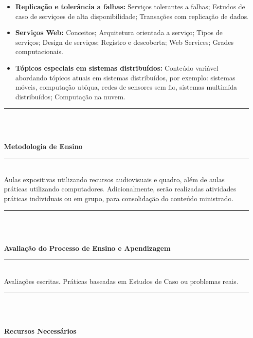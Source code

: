\begin{itemize}
\item \textbf{Replicação e tolerância a falhas:} Servi\c{c}os tolerantes a falhas; Estudos de caso de servi\c{c}oes de alta disponibilidade; Transa\c{c}\~oes com replica\c{c}\~ao de dados.

\item \textbf{Serviços Web:} Conceitos; Arquitetura orientada a servi\c{c}o; Tipos de servi\c{c}os; Design de servi\c{c}os; Registro e descoberta; Web Services; Grades computacionais.

\item \textbf{T\'opicos especiais em sistemas distribu\'idos:} Conte\'udo vari\'avel abordando t\'opicos atuais em sistemas distribu\'idos, por exemplo: sistemas m\'oveis, computa\c{c}\~ao ub\'iqua, redes de sensores sem fio, sistemas multim\'ida distribu\'idos; Computa\c{c}\~ao na nuvem.
\end{itemize}
\noindent\rule{16.5cm}{0.4pt}\\
\\
\vspace{-12mm}
\begin{center}\textbf{Metodologia de Ensino}\end{center} 
\vspace{-5mm}
\noindent\rule{16.5cm}{0.4pt}
\\
   Aulas expositivas utilizando recursos audiovisuais e quadro, além de aulas práticas utilizando computadores. Adicionalmente, serão realizadas atividades práticas individuais ou em grupo, para consolidação do conteúdo ministrado.\\
\noindent\rule{16.5cm}{0.4pt}\\
\\
\vspace{-12mm}
\begin{center}\textbf{Avaliação do Processo de Ensino e Apendizagem}\end{center}
\vspace{-5mm}
\noindent\rule{16.5cm}{0.4pt}
\\
   Avaliações escritas. Práticas baseadas em Estudos de Caso ou problemas reais.\\
\noindent\rule{16.5cm}{0.4pt}\\
\\
\vspace{-12mm}
\begin{center}\textbf{Recursos Necessários}\end{center}
